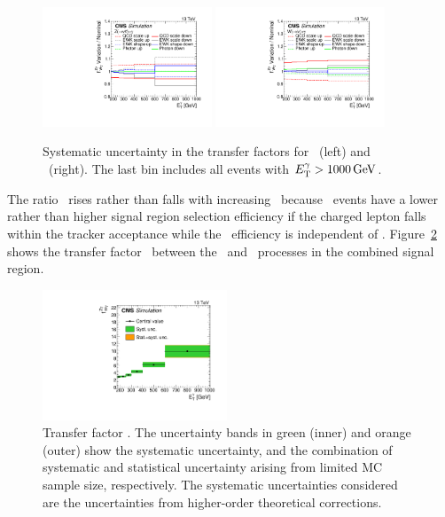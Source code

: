 \begin{figure}[htbp]
  \centering
    \includegraphics[width=0.45\textwidth]{Analysis/Figures/tf_syst_zg.pdf}
    \includegraphics[width=0.45\textwidth]{Analysis/Figures/tf_syst_wg.pdf}
    \caption{
      Systematic uncertainty in the transfer factors for \zinvg\ (left) and \wlng\ (right). The last bin includes all events with $E_{\mathrm{T}}^{\gamma} > 1000\,\text{Ge\hspace{-.08em}V}$.
    }
    \label{fig:tf_syst}
\end{figure}

The ratio \fZW\ rises rather than falls with increasing \ETg\ because \wlng\ events have a lower rather than higher signal region selection efficiency if the charged lepton falls within the tracker acceptance while the \zinvg\ efficiency is independent of \ETg. Figure~\ref{fig:tf_wz} shows the transfer factor \fZW\ between the \zinvg\ and \wlng\ processes in the combined signal region.


\begin{figure}[htbp]
  \centering
    \includegraphics[width=0.49\textwidth]{Analysis/Figures/fZW.pdf}
    \caption{
      Transfer factor \fZW. 
      The uncertainty bands in green (inner) and orange (outer) show the systematic uncertainty, and the combination of systematic and statistical uncertainty arising from limited MC sample size, respectively. 
      The systematic uncertainties considered are the uncertainties from higher-order theoretical corrections.
    }
    \label{fig:tf_wz}
\end{figure}

